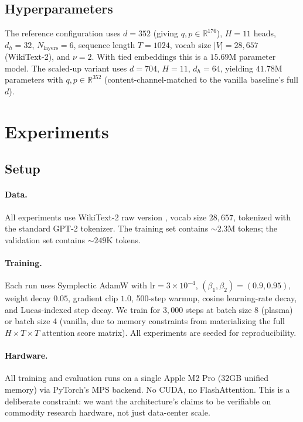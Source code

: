 \documentclass[11pt]{article}
\newcommand{\R}{\mathbb{R}}
\newcommand{\qphase}{q}
\newcommand{\pphase}{p}
\begin{document}
\subsection{Hyperparameters}

The reference configuration uses $d = 352$ (giving $\qphase, \pphase \in \R^{176}$),
$H = 11$ heads, $d_h = 32$, $N_{\text{layers}} = 6$, sequence length $T = 1024$,
vocab size $|V| = 28{,}657$ (WikiText-2), and $\nu = 2$. With tied embeddings
this is a $15.69$M parameter model. The scaled-up variant uses $d = 704$,
$H = 11$, $d_h = 64$, yielding $41.78$M parameters with $\qphase, \pphase \in \R^{352}$
(content-channel-matched to the vanilla baseline's full $d$).

\section{Experiments}
\label{sec:experiments}

\subsection{Setup}

\paragraph{Data.} All experiments use WikiText-2 raw version
\citep{merity2016pointer}, vocab size $28{,}657$, tokenized with the
standard GPT-2 tokenizer. The training set contains $\sim 2.3$M tokens;
the validation set contains $\sim 249$K tokens.

\paragraph{Training.} Each run uses Symplectic AdamW with $\text{lr} = 3 \times 10^{-4}$,
$(\beta_1, \beta_2) = (0.9, 0.95)$, weight decay $0.05$, gradient clip $1.0$,
500-step warmup, cosine learning-rate decay, and Lucas-indexed step decay.
We train for $3{,}000$ steps at batch size 8 (plasma) or batch size 4 (vanilla,
due to memory constraints from materializing the full $H \times T \times T$
attention score matrix). All experiments are seeded for reproducibility.

\paragraph{Hardware.} All training and evaluation runs on a single Apple M2 Pro
($32$GB unified memory) via PyTorch's MPS backend. No CUDA, no FlashAttention.
This is a deliberate constraint: we want the architecture's claims to be
verifiable on commodity research hardware, not just data-center scale.
\end{document}
